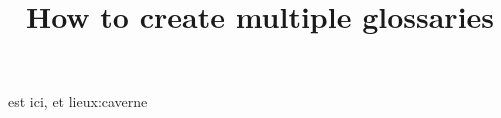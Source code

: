 \documentclass{article}
\title{How to create multiple glossaries}
\author{ }
\date{ }
\begin{document}
\maketitle


\DieuA est ici, et \gls{lieux:caverne}
 
\clearpage
 
\printglossaries
 
\end{document}
